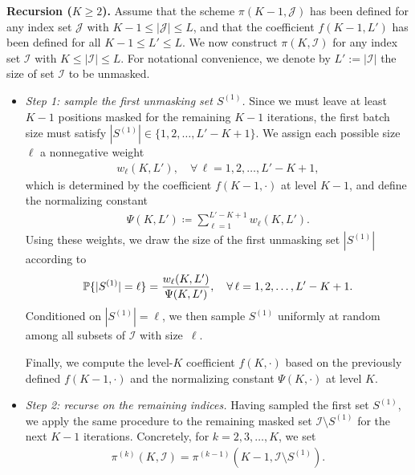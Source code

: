 \documentclass[english]{article}
\newcommand{\defn}{\coloneqq}
\newcommand{\cI}{\mathcal{I}}
\newcommand{\cJ}{\mathcal{J}}
\newcommand{\bP}{\mathbb{P}}
\newcommand{\tc}{\mathsf{tc}}
\begin{document}
\medskip
\noindent\textbf{Recursion ($K \geq 2$).}
Assume that the scheme $\pi(K-1, \cJ)$ has been defined for any index set $\cJ$ with $K-1 \leq |\cJ| \leq L$, and that the coefficient $f(K-1, L')$ has been defined for all $K-1 \leq L' \leq L$.
We now construct $\pi(K, \cI)$ for any index set $\cI$ with $K \leq |\cI| \leq L$. 
For notational convenience, we denote by $L' := |\cI|$ the size of set $\cI$ to be unmasked.
\begin{itemize}
    \item 
\textit{Step 1: sample the first unmasking set $S^{(1)}$.}
    Since we must leave at least $K-1$ positions masked for the remaining $K-1$ iterations, the first batch size must satisfy $|S^{(1)}|\in\{1, 2, \ldots, L'-K+1\}$.
We assign each possible size $\ell$ a nonnegative weight 
\begin{align}\label{eq:wl-def}
w_\ell (K,L'), \quad \forall\,\ell = 1, 2, \ldots, L'-K+1,
\end{align}
which is determined by the coefficient $f(K-1, \cdot)$ at level $K-1$,
and define the normalizing constant 
\begin{align}\label{eq:Psi-def}
\Psi(K,L') \defn \sum_{\ell=1}^{L'-K+1} w_\ell(K,L').
\end{align}
%
Using these weights, we draw the size of the first unmasking set $|S^{(1)}|$ according to
\begin{align}
    \notag
\bP\{|S^{(1)}| = \ell\} = \frac{w_\ell(K,L')}{\Psi(K,L')}, \quad \forall\,\ell = 1, 2, \ldots, L'-K+1.
\end{align}
%
Conditioned on $|S^{(1)}| = \ell$, we then sample $S^{(1)}$ uniformly at random among all subsets of $\cI$ with size~$\ell$.




Finally, we compute the level-$K$ coefficient $f(K,\cdot)$ based on the previously defined $f(K-1,\cdot)$ and the normalizing constant $\Psi(K,\cdot)$ at level $K$.


\item \textit{Step 2: recurse on the remaining indices.}
    Having sampled the first set $S^{(1)}$, we apply the same procedure to the remaining masked set $\cI \setminus S^{(1)}$ for the next $K-1$ iterations.
    Concretely, for $k=2,3,\ldots,K$, we set
    \begin{align}
        \pi^{(k)}(K, \cI) = \pi^{(k-1)}(K-1, \cI \setminus S^{(1)}).
    \end{align}
\end{itemize}
\end{document}
